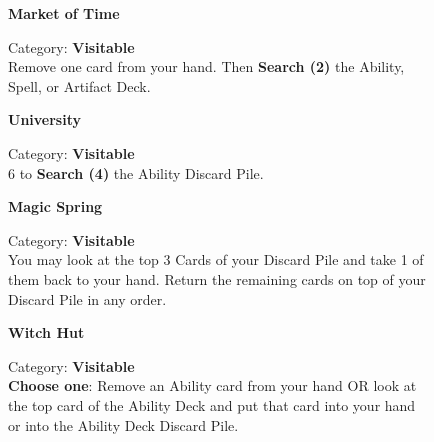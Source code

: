 \begin{figure}[H]
  \begin{minipage}[t]{0.47\textwidth}
    \vspace{0pt}
    \centering
    \phantom{j}\textbf{Market of Time}\par
    \caption{\small Category: \textbf{Visitable}\\ Remove one card from your hand.
Then \textbf{Search (2)} the Ability, Spell, or Artifact Deck.}
  \end{minipage}\hfill
  \begin{minipage}[t]{0.47\textwidth}
    \vspace{0pt}
    \centering
    \textbf{University}\par
    \caption{\small Category: \textbf{Visitable}\\
       6  to \textbf{Search (4)} the Ability Discard Pile.}
  \end{minipage}
\end{figure}

\begin{figure}[H]
  \begin{minipage}[t]{0.47\textwidth}
    \vspace{0pt}
    \centering
    \textbf{Magic Spring}\par
    \caption{\small Category: \textbf{Visitable}\\
      You may look at the top 3 Cards of your Discard Pile and take 1 of them back to your hand.
      Return the remaining cards on top of your Discard Pile in any order.}
  \end{minipage}\hfill
  \begin{minipage}[t]{0.47\textwidth}
    \vspace{0pt}
    \centering
    \phantom{j}\textbf{Witch Hut}\par
    \caption{\small Category: \textbf{Visitable}\\
      \textbf{Choose one}: Remove an Ability card from your hand OR look at the top card of the Ability Deck and put that card into your hand or into the Ability Deck Discard Pile.}
  \end{minipage}
\end{figure}

